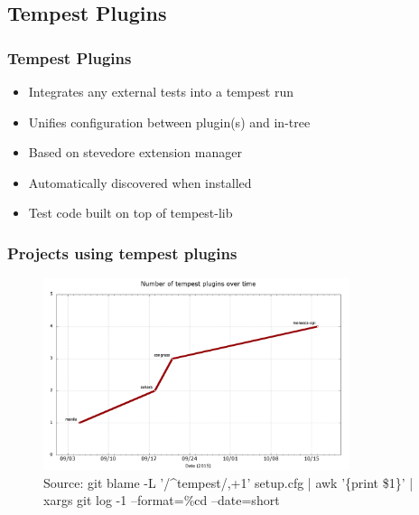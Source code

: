 \documentclass[aspectratio=169,11pt,hyperref={colorlinks=true}]{beamer}
\begin{document}
\subsection{Tempest Plugins}
\begin{frame}
    \frametitle{Tempest Plugins}
    \begin{itemize}
        \item Integrates any external tests into a tempest run
        \item Unifies configuration between plugin(s) and in-tree
    \end{itemize}
    \begin{itemize}
    	\item{Based on stevedore extension manager}
    	\item{Automatically discovered when installed}
    	\item{Test code built on top of tempest-lib}
    \end{itemize}
\end{frame}

\begin{frame}
    \frametitle{Projects using tempest plugins}
    \begin{figure}[p]
    	\centering
    	\includegraphics[width=0.8\textwidth]{tempest-plugins.png}
        \caption{Source: git blame -L '/\^{}tempest/,+1' setup.cfg | awk '\{print \$1\}' | xargs git log -1 --format=\%cd --date=short}
    \end{figure}
\end{frame}
\end{document}
